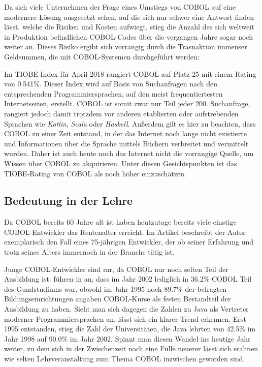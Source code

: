 Da sich viele Unternehmen der Frage eines Umstiegs von COBOL auf eine modernere Lösung ausgesetzt sehen, auf die sich nur schwer eine Antwort finden lässt, welche die Risiken und Kosten aufwiegt, stieg die Anzahl  des sich weltweit in Produktion befindlichen COBOL-Codes über die vergangen Jahre sogar noch weiter an.
Dieses Risiko ergibt sich vorrangig durch die Trasnaktion immenser Geldsummen, die mit COBOL-Systemen durchgeführt werden:  \cite{beat_balzli_cobol-programmierer_2017}

Im TIOBE-Index\cite{_tiobe_} für April 2018 rangiert COBOL auf Platz 25 mit einem Rating von 0.541\%. Dieser Index wird auf Basis von Suchanfragen nach den entsprechenden Programmiersprachen, auf den meist frequentiertesten Internetseiten, erstellt. COBOL ist somit zwar nur Teil jeder 200. Suchanfrage, rangiert jedoch damit trotzdem vor anderen etablierten oder aufstrebenden Sprachen wie \textit{Kotlin}, \textit{Scala} oder \textit{Haskell}. Außerdem gilt es hier zu beachten, dass COBOL zu einer Zeit entstand, in der das Internet noch lange nicht existierte und Informationen über die Sprache mittels Büchern verbreitet und vermittelt wurden. Daher ist auch heute noch das Internet nicht die vorrangige Quelle, um Wissen über COBOL zu akquirieren. Unter diesen Gesichtspunkten ist das TIOBE-Rating von COBOL als noch höher einzuschätzen.


\subsection*{Bedeutung in der Lehre}
Da COBOL bereits 60 Jahre alt ist haben heutzutage bereits viele einstige COBOL-Entwickler das Rentenalter erreicht. Im Artikel  beschreibt der Autor exemplarisch den Fall eines 75-jährigen Entwickler, der ob seiner Erfahrung und trotz seines Alters immernoch in der Branche tätig ist.

Junge COBOL-Entwickler sind rar, da COBOL nur noch selten Teil der Ausbildung ist. \citeauthor{doke_cobol_2005} führen in  an, dass im Jahr 2002 lediglich in 36.2\% COBOL Teil des Gundstudiums war, obwohl im Jahr 1995 noch 89.7\% der befragten Bildungseinrichtungen angaben COBOL-Kurse als festen Bestandteil der Ausbildung zu haben. Sieht man sich dagegen die Zahlen zu Java als Vertreter moderner Programmiersprachen an, lässt sich ein klarer Trend erkennen. Erst 1995 entstanden, stieg die Zahl der  Universitäten, die Java lehrten von 42.5\% im Jahr 1998 auf 90.0\% im Jahr 2002. Spinnt man diesen Wandel ins heutige Jahr weiter, zu dem sich in der Zwischenzeit noch eine Fülle neuerer lässt sich erahnen wie selten Lehrveranstaltung zum Thema COBOL inzwischen geworden sind.

